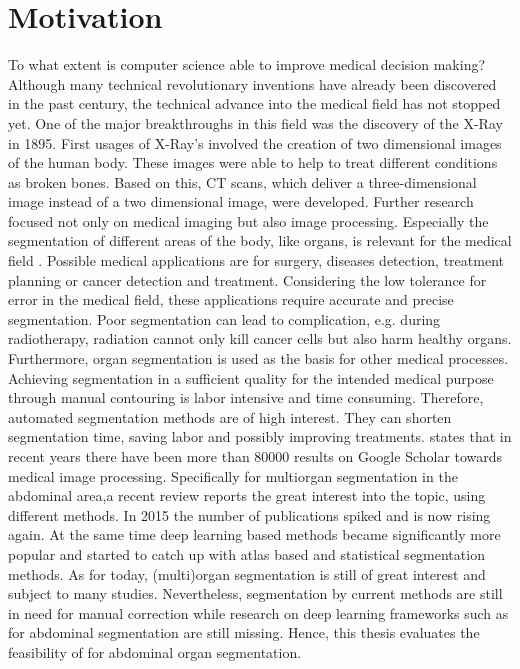 
\section{Motivation}
To what extent is computer science able to improve medical decision making? Although many technical revolutionary inventions  have already been discovered in the past century, the technical advance into the medical field has not stopped yet. One of the major breakthroughs in this field was the discovery of the X-Ray in 1895. First usages of X-Ray's involved the creation of two dimensional images of the human body. These images were able to help to treat different conditions as broken bones. Based on this, \ac{CT} scans, which deliver a three-dimensional image instead of a two dimensional image, were developed. Further research focused not only on medical imaging but also image processing. Especially the segmentation of different areas of the body, like organs, is relevant for the medical field  \cite{Aljabri.2022}.  Possible medical applications are for surgery, diseases detection, treatment planning or cancer detection and treatment. Considering the low tolerance for error in the medical field, these applications require accurate and precise segmentation. Poor segmentation can lead to complication, e.g. during radiotherapy, radiation cannot only kill cancer cells but also harm healthy organs. Furthermore, organ segmentation is used as the basis for other medical processes. Achieving segmentation in a sufficient quality for the intended medical purpose through manual contouring is labor intensive and time consuming. Therefore, automated segmentation methods are of high interest. They can shorten segmentation time, saving labor and possibly improving treatments.  \citeauthor{Altini.2022} \cite{Altini.2022}  states that in recent years there have been more than 80000 results on Google Scholar towards medical image processing. Specifically for multiorgan segmentation in the abdominal area,a recent review \cite{Kaur.2022} reports the great interest into the topic, using different methods. In 2015 the number of publications spiked and is now rising again. At the same time deep learning based methods became significantly more popular and started to catch up with atlas based and statistical segmentation methods. As for today, (multi)organ segmentation is still of great interest and subject to many studies. Nevertheless, segmentation by current methods are still in need for manual correction while research on deep learning frameworks such as   \cite{He.op.2017}  for abdominal segmentation are still missing. Hence, this thesis evaluates the feasibility of   \cite{He.op.2017} for abdominal organ segmentation.





